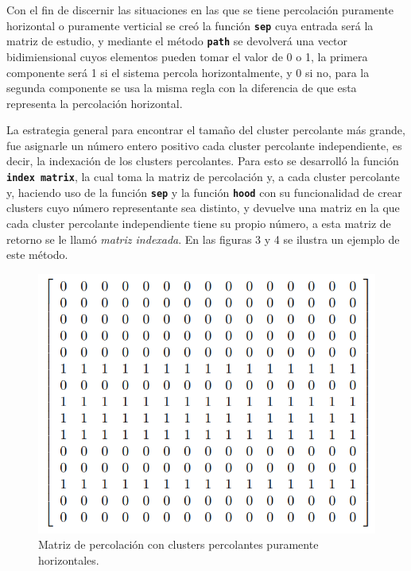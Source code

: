 \documentclass[11pt,twocolumn]{article}
\begin{document}
Con el fin de discernir las situaciones en las que se tiene percolación puramente horizontal o puramente verticial se creó la función \texttt{\textbf{sep}} cuya entrada será la matriz de estudio, y mediante el método \texttt{\textbf{path}} se devolverá una vector bidimiensional cuyos elementos pueden tomar el valor de 0 o 1, la primera componente será 1 si el sistema percola horizontalmente, y 0 si no, para la segunda componente se usa la misma regla con la diferencia de que esta representa la percolación horizontal.
\vspace{0.2 cm}

La estrategia general para encontrar el tamaño del cluster percolante más grande, fue asignarle un número entero positivo cada cluster percolante independiente, es decir, la indexación de los clusters percolantes. Para esto se desarrolló la función \texttt{\textbf{index matrix}}, la cual toma la matriz de percolación y, a cada cluster percolante y, haciendo uso de la función \texttt{\textbf{sep}} y la función \texttt{\textbf{hood}} con su funcionalidad de crear clusters cuyo número representante sea distinto, y devuelve una matriz en la que cada cluster percolante independiente tiene su propio número, a esta matriz de retorno se le llamó \textit{matriz indexada}. En las figuras 3 y 4 se ilustra un ejemplo de este método.
 \begin{figure}[H]
    \centering
    \includegraphics[scale=0.4]{Imagenes/matriz3.png}
    \caption{Matriz de percolación con clusters percolantes puramente horizontales.}
    \label{matrix}
\end{figure}
\end{document}
